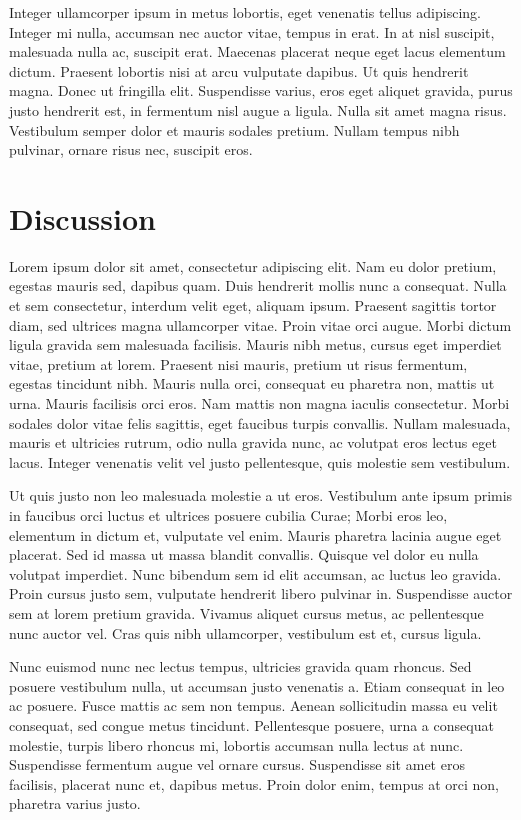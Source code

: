 \documentclass[manuscript]{geophysics}
\begin{document}
Integer ullamcorper ipsum in metus lobortis, eget venenatis tellus adipiscing.
Integer mi nulla, accumsan nec auctor vitae, tempus in erat. In at nisl
suscipit, malesuada nulla ac, suscipit erat. Maecenas placerat neque eget lacus
elementum dictum. Praesent lobortis nisi at arcu vulputate dapibus. Ut quis
hendrerit magna. Donec ut fringilla elit. Suspendisse varius, eros eget aliquet
gravida, purus justo hendrerit est, in fermentum nisl augue a ligula. Nulla sit
amet magna risus. Vestibulum semper dolor et mauris sodales pretium. Nullam
tempus nibh pulvinar, ornare risus nec, suscipit eros.

\section{Discussion}

Lorem ipsum dolor sit amet, consectetur adipiscing elit. Nam eu dolor pretium,
egestas mauris sed, dapibus quam. Duis hendrerit mollis nunc a consequat. Nulla
et sem consectetur, interdum velit eget, aliquam ipsum. Praesent sagittis
tortor diam, sed ultrices magna ullamcorper vitae. Proin vitae orci augue.
Morbi dictum ligula gravida sem malesuada facilisis. Mauris nibh metus, cursus
eget imperdiet vitae, pretium at lorem. Praesent nisi mauris, pretium ut risus
fermentum, egestas tincidunt nibh. Mauris nulla orci, consequat eu pharetra
non, mattis ut urna. Mauris facilisis orci eros. Nam mattis non magna iaculis
consectetur. Morbi sodales dolor vitae felis sagittis, eget faucibus turpis
convallis. Nullam malesuada, mauris et ultricies rutrum, odio nulla gravida
nunc, ac volutpat eros lectus eget lacus. Integer venenatis velit vel justo
pellentesque, quis molestie sem vestibulum.

Ut quis justo non leo malesuada molestie a ut eros. Vestibulum ante ipsum
primis in faucibus orci luctus et ultrices posuere cubilia Curae; Morbi eros
leo, elementum in dictum et, vulputate vel enim. Mauris pharetra lacinia augue
eget placerat. Sed id massa ut massa blandit convallis. Quisque vel dolor eu
nulla volutpat imperdiet. Nunc bibendum sem id elit accumsan, ac luctus leo
gravida. Proin cursus justo sem, vulputate hendrerit libero pulvinar in.
Suspendisse auctor sem at lorem pretium gravida. Vivamus aliquet cursus metus,
ac pellentesque nunc auctor vel. Cras quis nibh ullamcorper, vestibulum est et,
cursus ligula.

Nunc euismod nunc nec lectus tempus, ultricies gravida quam rhoncus. Sed
posuere vestibulum nulla, ut accumsan justo venenatis a. Etiam consequat in leo
ac posuere. Fusce mattis ac sem non tempus. Aenean sollicitudin massa eu velit
consequat, sed congue metus tincidunt. Pellentesque posuere, urna a consequat
molestie, turpis libero rhoncus mi, lobortis accumsan nulla lectus at nunc.
Suspendisse fermentum augue vel ornare cursus. Suspendisse sit amet eros
facilisis, placerat nunc et, dapibus metus. Proin dolor enim, tempus at orci
non, pharetra varius justo.
\end{document}
